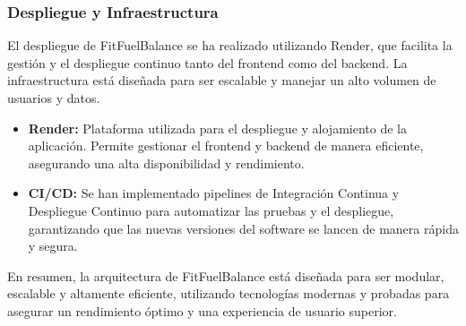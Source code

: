 \subsubsection{Despliegue y Infraestructura}

El despliegue de FitFuelBalance se ha realizado utilizando Render, que facilita la gestión y el despliegue continuo tanto del frontend como del backend. La infraestructura está diseñada para ser escalable y manejar un alto volumen de usuarios y datos.

\begin{itemize}
    \item \textbf{Render:} Plataforma utilizada para el despliegue y alojamiento de la aplicación. Permite gestionar el frontend y backend de manera eficiente, asegurando una alta disponibilidad y rendimiento.
    \item \textbf{CI/CD:} Se han implementado pipelines de Integración Continua y Despliegue Continuo para automatizar las pruebas y el despliegue, garantizando que las nuevas versiones del software se lancen de manera rápida y segura.
\end{itemize}

En resumen, la arquitectura de FitFuelBalance está diseñada para ser modular, escalable y altamente eficiente, utilizando tecnologías modernas y probadas para asegurar un rendimiento óptimo y una experiencia de usuario superior.
